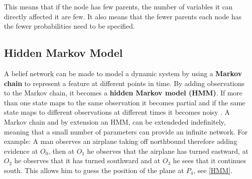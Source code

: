 This means that if the node has few parents, the number of variables it can
directly affected it are few. It also means that the fewer parents each node
has the fewer probabilities need to be specified.

\subsection{Hidden Markov Model}

A belief network can be made to model a dynamic system by using a \textbf{Markov
chain} to represent a feature at different points in time. By adding
observations to the Markov chain, it becomes a \textbf{hidden Markov
model (HMM)}. If more than one state maps to the same observation it
becomes partial and if the same state maps to different observations at
different times it becomes noisy \citep[ch.6.5.2]{MIBook}. A Markov chain and by
extension an HMM, can be extendeded indefinitely, meaning that a small number
of parameters can provide an infinite network\citep[ch.6.5.1]{MIBook}. For
example: A man observes an airplane taking off northbound therefore adding
evidence at $O_0$, then at $O_1$ he observes that the airplane has turned
eastward, at $O_2$ he observes that it has turned southward and at $O_3$ he
sees that it continues south. This allows him to guess the position of the
plane at $P_4$, see \autoref{HMM}.





% 

